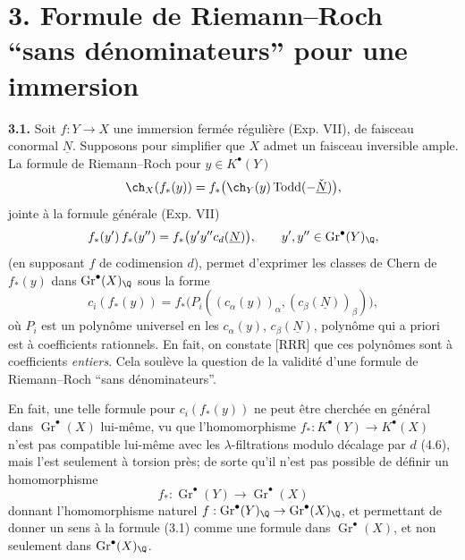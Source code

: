 \section*{3. Formule de Riemann--Roch ``sans dénominateurs'' pour une immersion}

\textbf{3.1.} Soit $f:Y\to X$ une immersion fermée régulière (Exp. VII), de faisceau conormal $\underline N$. Supposons pour simplifier que $X$ admet un faisceau inversible ample. La formule de Riemann--Roch pour $y\in K^\bullet(Y)$
\[
 \ch_X(f_*(y))=f_*\bigl(\ch_Y(y)\operatorname{Todd}(-\check{\underline N})\bigr),
\]
jointe à la formule générale (Exp. VII)
\[
 f_*(y')\,f_*(y'')=f_*\bigl(y'y''c_d(\underline N)\bigr),\qquad y',y''\in \operatorname{Gr}^\bullet(Y)_\Q,
\]
(en supposant $f$ de codimension $d$), permet d'exprimer les classes de Chern de $f_*(y)$ dans $\operatorname{Gr}^\bullet(X)_\Q$ sous la forme
\begin{equation}\tag{3.1}
 c_i(f_*(y))=f_*\bigl(P_i((c_\alpha(y))_\alpha,(c_\beta(\underline N))_\beta)\bigr),
\end{equation}
où $P_i$ est un polynôme universel en les $c_\alpha(y)$, $c_\beta(\underline N)$, polynôme qui a priori est à coefficients rationnels. En fait, on constate [RRR] que ces polynômes sont à coefficients \emph{entiers}. Cela soulève la question de la validité d'une formule de Riemann--Roch ``sans dénominateurs''.

En fait, une telle formule pour $c_i(f_*(y))$ ne peut être cherchée en général dans $\operatorname{Gr}^\bullet(X)$ lui-même, vu que l'homomorphisme $f_*:K^\bullet(Y)\to K^\bullet(X)$ n'est pas compatible lui-même avec les $\lambda$-filtrations modulo décalage par $d$ (4.6), mais l'est seulement à torsion près; de sorte qu'il n'est pas possible de définir un homomorphisme
\[
 f_*:\operatorname{Gr}^\bullet(Y)\longrightarrow \operatorname{Gr}^\bullet(X)
\]
donnant l'homomorphisme naturel $f:\operatorname{Gr}^\bullet(Y)_\Q\to\operatorname{Gr}^\bullet(X)_\Q$, et permettant de donner un sens à la formule (3.1) comme une formule dans $\operatorname{Gr}^\bullet(X)$, et non seulement dans $\operatorname{Gr}^\bullet(X)_\Q$.


